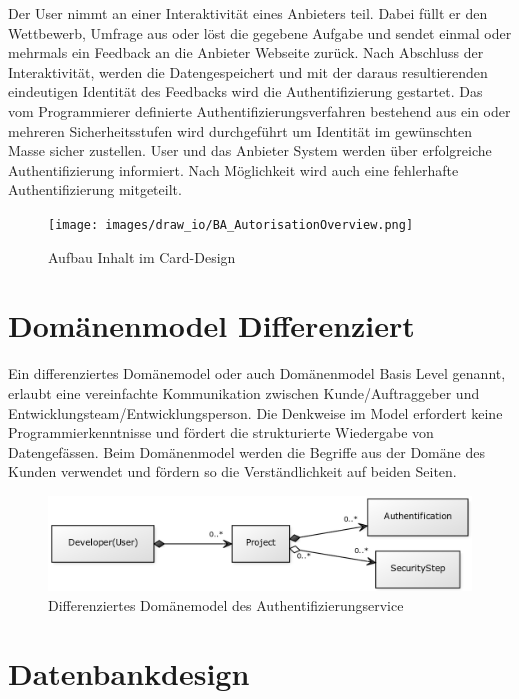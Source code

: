 Der User nimmt an einer Interaktivität eines Anbieters teil. Dabei füllt
er den Wettbewerb, Umfrage aus oder löst die gegebene Aufgabe und sendet
einmal oder mehrmals ein Feedback an die Anbieter Webseite zurück. Nach
Abschluss der Interaktivität, werden die Datengespeichert und mit der
daraus resultierenden eindeutigen Identität des Feedbacks wird die
Authentifizierung gestartet. Das vom Programmierer definierte
Authentifizierungsverfahren bestehend aus ein oder mehreren
Sicherheitsstufen wird durchgeführt um Identität im gewünschten Masse
sicher zustellen. User und das Anbieter System werden über erfolgreiche
Authentifizierung informiert. Nach Möglichkeit wird auch eine
fehlerhafte Authentifizierung mitgeteilt.

\begin{figure}[htbp]
\centering
\texttt{[image: images/draw\_io/BA\_AutorisationOverview.png]}
\caption{Aufbau Inhalt im Card-Design}
\end{figure}

\section{Domänenmodel
Differenziert}\label{domuxe4nenmodel-differenziert}

Ein differenziertes Domänemodel oder auch Domänenmodel Basis Level
genannt, erlaubt eine vereinfachte Kommunikation zwischen
Kunde/Auftraggeber und Entwicklungsteam/Entwicklungsperson. Die
Denkweise im Model erfordert keine Programmierkenntnisse und fördert die
strukturierte Wiedergabe von Datengefässen. Beim Domänenmodel werden die
Begriffe aus der Domäne des Kunden verwendet und fördern so die
Verständlichkeit auf beiden Seiten.

\begin{figure}[htbp]
\centering
\includegraphics{images/domaenenmodell.png}
\caption{Differenziertes Domänemodel des Authentifizierungservice}
\end{figure}

\newpage

\section{Datenbankdesign}\label{datenbankdesign}

